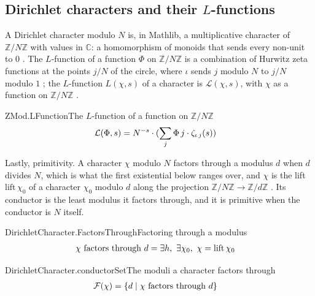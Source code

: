 \documentclass{article}
\begin{document}
\subsection{Dirichlet characters and their $L$-functions}

A Dirichlet character modulo $N$ is, in Mathlib, a multiplicative character
of $\mathbb{Z}/N\mathbb{Z}$ with values in $\mathbb{C}$: a homomorphism of
monoids that sends every non-unit to $0$
. The $L$-function of a function
$\Phi$ on $\mathbb{Z}/N\mathbb{Z}$ is a combination of Hurwitz zeta
functions at the points $j/N$ of the circle, where $\iota$ sends $j$ modulo
$N$ to $j/N$ modulo $1$ ; the $L$-function
$L(\chi, s)$ of a character is $\mathcal{L}(\chi, s)$, with $\chi$ as a
function on $\mathbb{Z}/N\mathbb{Z}$ .

\begin{leandefinition}[def, sum=AebIKqzGj3]{ZMod.LFunction}{The $L$-function of a function on $\mathbb{Z}/N\mathbb{Z}$}
\label{def:ZMod.LFunction}
\[\LeanMath{\begin{aligned}\mathcal{L}(\Phi, s) &= N^{-s} \cdot (\sum_{j} \Phi\,j \cdot \zeta_{\iota\,j}(s))\end{aligned}}\]
\end{leandefinition}

Lastly, primitivity. A character $\chi$ modulo $N$ factors through a
modulus $d$ when $d$ divides $N$, which is what the first existential below
ranges over, and $\chi$ is the lift $\mathrm{lift}\,\chi_0$ of a character
$\chi_0$ modulo $d$ along the projection
$\mathbb{Z}/N\mathbb{Z} \to \mathbb{Z}/d\mathbb{Z}$
. Its conductor is the least
modulus it factors through, and it is primitive when the conductor is $N$
itself.

\begin{leandefinition}[def, sum=i4iPvoH_LX]{DirichletCharacter.FactorsThrough}{Factoring through a modulus}
\label{def:DirichletCharacter.FactorsThrough}
\[\LeanMath{\begin{aligned}\chi \text{ factors through } d &= \exists h,\ \exists \chi_{0},\ \chi = \mathrm{lift}\,\chi_{0}\end{aligned}}\]
\end{leandefinition}

\begin{leandefinition}[def, sum=ojvOnn5cn-]{DirichletCharacter.conductorSet}{The moduli a character factors through}
\label{def:DirichletCharacter.conductorSet}
\[\LeanMath{\begin{aligned}\mathcal{F}(\chi) &= \{d \mid \chi \text{ factors through } d\}\end{aligned}}\]
\end{leandefinition}
\end{document}
